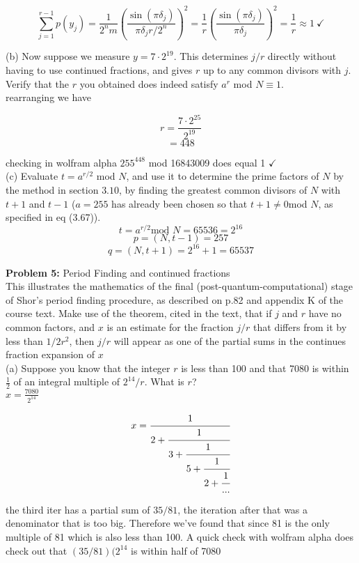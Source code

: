 $$\sum_{j=1}^{r-1}p(y_j)=\frac{1}{2^nm}\left(\frac{\sin(\pi\delta_j)}{\pi\delta_jr/2^n}\right)^2=\frac{1}{r}\left(\frac{\sin(\pi\delta_j)}{\pi\delta_j}\right)^2=\frac{1}{r}\approx1~\checkmark$$

(b) Now suppose we measure $y=7\cdot2^19$. This determines $j/r$ directly
without having to use continued fractions, and gives $r$ up to any common
divisors with $j$. Verify that the $r$ you obtained does indeed satisfy
$a^r$ mod $N\equiv1$.\\

rearranging we have

$$r=\frac{7\cdot2^{25}}{2^{19}}$$
$$=448$$

checking in wolfram alpha $255^{448}$ mod 16843009 does equal 1 $\checkmark$\\

(c) Evaluate $t=a^{r/2}$ mod $N$, and use it to determine the prime factors of
$N$ by the method in section $3.10$, by finding the greatest common divisors of
$N$ with $t+1$ and $t-1$ ($a=255$ has already been chosen so that
$t+1\not=0$mod $N$, as specified in eq (3.67)).\\

$$t=a^{r/2}\text{mod } N=65536=2^{16}$$
$$p=(N,t-1)=257$$
$$q=(N,t+1)=2^{16}+1=65537$$


\textbf{Problem 5:} Period Finding and continued fractions\\

This illustrates the mathematics of the final (post-quantum-computational)
stage of Shor's period finding procedure, as described on p.82 and appendix K
of the course text. Make use of the theorem, cited in the text, that if $j$ and
$r$ have no common factors, and $x$ is an estimate for the fraction $j/r$
that differs from it by less than $1/2r^2$, then $j/r$ will appear as one of the
partial sums in the continues fraction expansion of $x$\\

(a) Suppose you know that the integer $r$ is less than 100 and that 7080 is
within $\frac{1}{2}$ of an integral multiple of $2^{14}/r$. What is $r$?\\

$x=\frac{7080}{2^{14}}$

$$x=\cfrac{1}{2+\cfrac{1}{3+\cfrac{1}{5+\cfrac{1}{2+\cfrac{1}{...}}}}}$$

the third iter has a partial sum of $35/81$, the iteration after that was a
denominator that is too big. Therefore we've found that since 81 is the only
multiple of 81 which is also less than 100. A quick check with wolfram alpha
does check out that $(35/81)(2^{14}$ is within half of 7080\\



